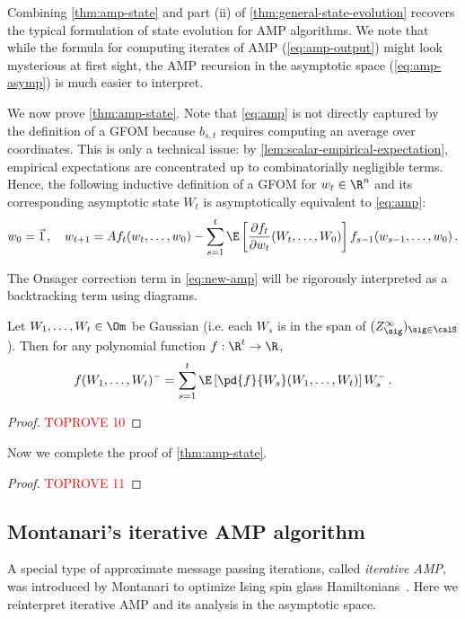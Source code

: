 \documentclass[12pt]{article}
\begin{document}
Combining \cref{thm:amp-state} and part (ii) of \cref{thm:general-state-evolution} recovers the typical formulation of state evolution for AMP algorithms. We note that while the formula for
computing iterates of AMP (\cref{eq:amp-output}) might look mysterious
at first sight, the AMP recursion in the
asymptotic space (\cref{eq:amp-asymp}) is much
easier to interpret.


We now prove \cref{thm:amp-state}.
Note that \cref{eq:amp} is not directly captured by the definition of a GFOM because $b_{s,t}$ requires computing an average over coordinates. This is only a technical issue: by \cref{lem:scalar-empirical-expectation}, empirical expectations are concentrated up to combinatorially negligible terms. 
Hence, the following inductive definition of a GFOM for $w_t\in\R^n$ and its corresponding asymptotic state $W_t$ is asymptotically equivalent to \cref{eq:amp}:
\begin{align}
    w_0=\vec{1}\,,\quad w_{t+1} = Af_t(w_t,\ldots,w_0) - \sum_{s=1}^t \E\left[\frac {\partial f_t}{\partial w_t}(W_t,\ldots,W_0)\right] f_{s-1}(w_{s-1},\ldots,w_0)\,.\label{eq:new-amp}
\end{align}

The Onsager correction term in \cref{eq:new-amp} will be rigorously interpreted as a backtracking term using diagrams.


\begin{lemma}\label{lem:taylor-expand}
    Let $W_1, \dots, W_t \in \Om$ be Gaussian (i.e. each $W_s$ is
    in the span of $(Z^\infty_\sig)_{\sig \in \calS}$). Then for any polynomial function $f : \R^t \to \R$,
    \[
        f(W_1, \dots, W_t)^- = \sum_{s = 1}^t  \E\left[\pd{f}{W_s}(W_1, \dots, W_t)\right] W_s^-\,.
    \]
\end{lemma}

\begin{proof}\textcolor{red}{TOPROVE 10}\end{proof}


Now we complete the proof of \cref{thm:amp-state}.

\begin{proof}\textcolor{red}{TOPROVE 11}\end{proof}

\subsection{Montanari's iterative AMP algorithm}
\label{sec:montanari}

A special type of approximate message passing
iterations, called {\em iterative AMP},
was introduced by Montanari to
optimize Ising spin glass 
Hamiltonians~\cite{montanari2021optimization, AM20,AMS20:pSpinGlasses}. Here we reinterpret
iterative AMP and its analysis in the
asymptotic space.
\end{document}
